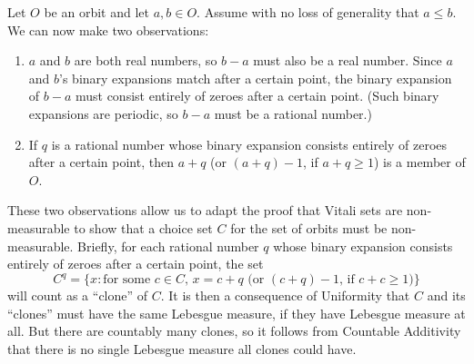 \documentclass[12pt,a4paper]{article}
\begin{document}
\begin{enumerate}
\begin{enumerate}
{Let $O$ be an orbit and let $a,b \in O$. Assume with no loss of generality that $a \leq b$. We can now make two observations:

\begin{enumerate}
\item  $a$ and $b$ are both real numbers, so $b-a$ must also be a real number. Since $a$ and $b$'s binary expansions match after a certain point, the binary expansion of $b-a$ must consist entirely of zeroes after a certain point. (Such binary expansions are periodic, so $b-a$ must be a rational number.)

\item If $q$ is a rational number whose binary expansion consists entirely of zeroes after a certain point, then $a+q$ (or $(a+q) -1$, if $a+q \geq 1$) is a member of $O$.

\end{enumerate}
These two observations allow us to adapt the proof that Vitali sets are non-measurable to show that a choice set $C$ for the set of orbits must be non-measurable. Briefly, for each rational number $q$ whose binary expansion consists entirely of zeroes after a certain point, the set
$$C^q = \{x : \text{for some $c \in C$, $x = c+q$ (or $(c+q) - 1$, if $c+c \geq 1$)} \}$$
will count as a ``clone'' of $C$. It is then a consequence of Uniformity that $C$ and its ``clones'' must have the same Lebesgue measure, if they have Lebesgue measure at all. But there are countably many clones, so it follows from Countable Additivity that there is no single Lebesgue measure all clones could have.
}
\end{enumerate}
\end{enumerate}
\end{document}
